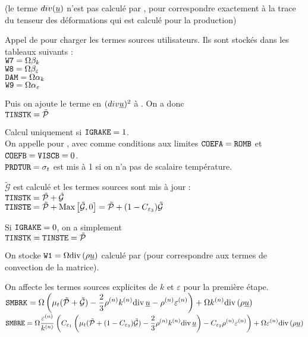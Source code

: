 (le terme $div(\underline{u})$ n'est pas calcul\'e par , pour
correspondre exactement \`a la trace du tenseur des d\'eformations qui est
calcul\'e pour la production)


Appel de  pour charger les termes sources utilisateurs. Ils sont
stock\'es dans les tableaux suivants :\\
$\text{\texttt{W7}}=\Omega\beta_k$\\
$\text{\texttt{W8}}=\Omega\beta_\varepsilon$\\
$\text{\texttt{DAM}}=\Omega\alpha_k$\\
$\text{\texttt{W9}}=\Omega\alpha_\varepsilon$

Puis on ajoute le terme en $(div\underline{u})^2$ \`a . On a donc \\
$\text{\texttt{TINSTK}}=\tilde{\mathcal{P}}$

Calcul uniquement si $\text{\texttt{IGRAKE}}=1$.\\
On appelle  pour , avec comme conditions aux limites
$\text{\texttt{COEFA}}=\text{\texttt{ROMB}}$ et \mbox{$\text{\texttt{COEFB}}=\text{\texttt{VISCB}}=0$}.\\
$\text{\texttt{PRDTUR}}=\sigma_t$ est mis \`a 1 si on n'a pas de scalaire temp\'erature.

$\tilde{\mathcal{G}}$ est calcul\'e et les termes sources sont mis \`a jour :\\
$\text{\texttt{TINSTK}}=\tilde{\mathcal{P}}+\tilde{\mathcal{G}}$\\
$\text{\texttt{TINSTE}}=\tilde{\mathcal{P}}+\text{Max}\left[\tilde{\mathcal{G}},0\right]
=\tilde{\mathcal{P}}+(1-C_{\varepsilon_3})\tilde{\mathcal{G}}$

Si $\text{\texttt{IGRAKE}}=0$, on a simplement\\
$\text{\texttt{TINSTK}}=\text{\texttt{TINSTE}}=\tilde{\mathcal{P}}$

On stocke
$\displaystyle \text{\texttt{W1}}=\Omega\text{div}\,(\rho\underline{u})$
calcul\'e par  (pour correspondre aux termes de convection de la
matrice).

On affecte les termes sources explicites de $k$ et $\varepsilon$ pour la
premi\`ere \'etape.\\
$\displaystyle\text{\texttt{SMBRK}}=\Omega\left(\mu_t(\tilde{\mathcal{P}}+\tilde{\mathcal{G}})
-\frac{2}{3}\rho^{(n)} k^{(n)}\text{div}\,{\underline{u}}
-\rho^{(n)} \varepsilon^{(n)}\right)+\Omega k^{(n)}\text{div}\,(\rho\underline{u})$\\
$\displaystyle\text{\texttt{SMBRE}}=\Omega\frac{\varepsilon^{(n)}}{k^{(n)}}
\left(C_{\varepsilon_1}\left(
\mu_t(\tilde{\mathcal{P}}+(1-C_{\varepsilon_3})\tilde{\mathcal{G}})
-\frac{2}{3}\rho^{(n)} k^{(n)}\text{div}\,{\underline{u}}\right)
-C_{\varepsilon_2}\rho^{(n)}\varepsilon^{(n)}\right)
+\Omega\varepsilon^{(n)}\text{div}\,(\rho\underline{u})$

